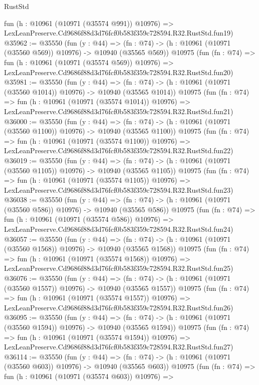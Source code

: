 \begin{lexlean}{RustStd}
\begin{coremodule}
    fun (h : @10961 (@10971 (@35574 @991)) @10976) =>
    LexLeanPreserve.Cd9686f88d3d76fcf0b583f359c728594.R32.RustStd.fun19)
@35962 := @35550
    (fun (y : @44) =>
    (fn : @74) -> (h : @10961 (@10971 (@35560 @569)) @10976) -> @10940 (@35565 @569))
    @10975
    (fun (fn : @74) =>
    fun (h : @10961 (@10971 (@35574 @569)) @10976) =>
    LexLeanPreserve.Cd9686f88d3d76fcf0b583f359c728594.R32.RustStd.fun20)
@35981 := @35550
    (fun (y : @44) =>
    (fn : @74) -> (h : @10961 (@10971 (@35560 @1014)) @10976) -> @10940 (@35565 @1014))
    @10975
    (fun (fn : @74) =>
    fun (h : @10961 (@10971 (@35574 @1014)) @10976) =>
    LexLeanPreserve.Cd9686f88d3d76fcf0b583f359c728594.R32.RustStd.fun21)
@36000 := @35550
    (fun (y : @44) =>
    (fn : @74) -> (h : @10961 (@10971 (@35560 @1100)) @10976) -> @10940 (@35565 @1100))
    @10975
    (fun (fn : @74) =>
    fun (h : @10961 (@10971 (@35574 @1100)) @10976) =>
    LexLeanPreserve.Cd9686f88d3d76fcf0b583f359c728594.R32.RustStd.fun22)
@36019 := @35550
    (fun (y : @44) =>
    (fn : @74) -> (h : @10961 (@10971 (@35560 @1105)) @10976) -> @10940 (@35565 @1105))
    @10975
    (fun (fn : @74) =>
    fun (h : @10961 (@10971 (@35574 @1105)) @10976) =>
    LexLeanPreserve.Cd9686f88d3d76fcf0b583f359c728594.R32.RustStd.fun23)
@36038 := @35550
    (fun (y : @44) =>
    (fn : @74) -> (h : @10961 (@10971 (@35560 @586)) @10976) -> @10940 (@35565 @586))
    @10975
    (fun (fn : @74) =>
    fun (h : @10961 (@10971 (@35574 @586)) @10976) =>
    LexLeanPreserve.Cd9686f88d3d76fcf0b583f359c728594.R32.RustStd.fun24)
@36057 := @35550
    (fun (y : @44) =>
    (fn : @74) -> (h : @10961 (@10971 (@35560 @1568)) @10976) -> @10940 (@35565 @1568))
    @10975
    (fun (fn : @74) =>
    fun (h : @10961 (@10971 (@35574 @1568)) @10976) =>
    LexLeanPreserve.Cd9686f88d3d76fcf0b583f359c728594.R32.RustStd.fun25)
@36076 := @35550
    (fun (y : @44) =>
    (fn : @74) -> (h : @10961 (@10971 (@35560 @1557)) @10976) -> @10940 (@35565 @1557))
    @10975
    (fun (fn : @74) =>
    fun (h : @10961 (@10971 (@35574 @1557)) @10976) =>
    LexLeanPreserve.Cd9686f88d3d76fcf0b583f359c728594.R32.RustStd.fun26)
@36095 := @35550
    (fun (y : @44) =>
    (fn : @74) -> (h : @10961 (@10971 (@35560 @1594)) @10976) -> @10940 (@35565 @1594))
    @10975
    (fun (fn : @74) =>
    fun (h : @10961 (@10971 (@35574 @1594)) @10976) =>
    LexLeanPreserve.Cd9686f88d3d76fcf0b583f359c728594.R32.RustStd.fun27)
@36114 := @35550
    (fun (y : @44) =>
    (fn : @74) -> (h : @10961 (@10971 (@35560 @603)) @10976) -> @10940 (@35565 @603))
    @10975
    (fun (fn : @74) =>
    fun (h : @10961 (@10971 (@35574 @603)) @10976) =>

\end{coremodule}
\end{lexlean}

